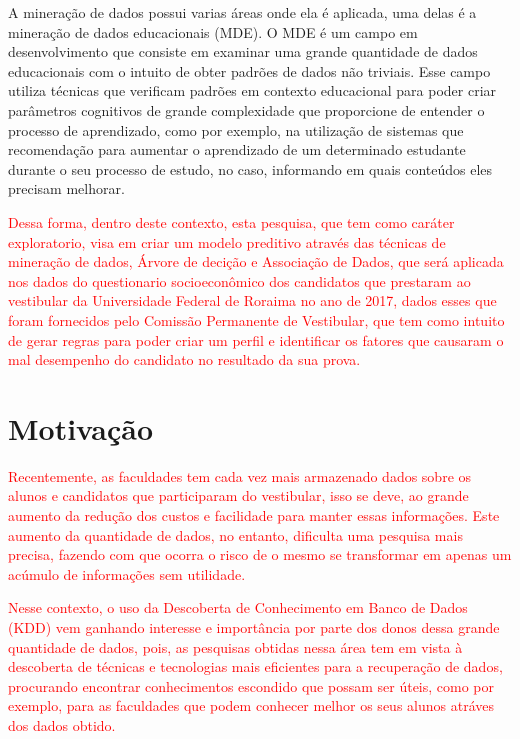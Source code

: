 \par
A mineração de dados possui varias áreas onde ela é aplicada, uma delas é a mineração de dados educacionais (MDE). O MDE é um campo em desenvolvimento que consiste em examinar uma grande quantidade de dados educacionais com o intuito de obter padrões de dados não triviais. Esse campo utiliza técnicas que verificam padrões em contexto educacional para poder criar parâmetros cognitivos de grande complexidade que proporcione de entender o processo de aprendizado, como por exemplo, na utilização de sistemas que recomendação para aumentar o aprendizado de um determinado estudante durante o seu processo de estudo, no caso, informando em quais conteúdos eles precisam melhorar.

\par
\textcolor{red}{Dessa forma, dentro deste contexto, esta pesquisa, que tem como caráter exploratorio, visa em criar um modelo preditivo através das técnicas de mineração de dados, Árvore de decição e Associação de Dados, que será aplicada nos dados do questionario socioeconômico dos candidatos que prestaram ao vestibular da Universidade Federal de Roraima no ano de 2017, dados esses que foram fornecidos pelo Comissão Permanente de Vestibular, que tem como intuito de gerar regras para poder criar um perfil e identificar os fatores que causaram o mal desempenho do candidato no resultado da sua prova.}







\section{Motivação}

\textcolor{red}{Recentemente, as faculdades tem cada vez mais armazenado dados sobre os alunos e candidatos que participaram do vestibular, isso se deve, ao  grande aumento da redução dos custos e facilidade para manter essas informações. Este aumento da quantidade de dados, no entanto, dificulta uma pesquisa mais precisa, fazendo com que ocorra o risco de o mesmo se transformar em apenas um acúmulo de informações sem utilidade. }

\par
\textcolor{red}{Nesse contexto, o uso da Descoberta de Conhecimento em Banco de Dados (KDD) vem ganhando interesse e importância por parte dos donos dessa grande quantidade de dados, pois, as pesquisas obtidas nessa área tem em vista à descoberta de técnicas e tecnologias mais eficientes para a recuperação de dados, procurando encontrar conhecimentos escondido que possam ser úteis, como por exemplo, para as faculdades que podem conhecer melhor os seus alunos atráves dos dados obtido.}

